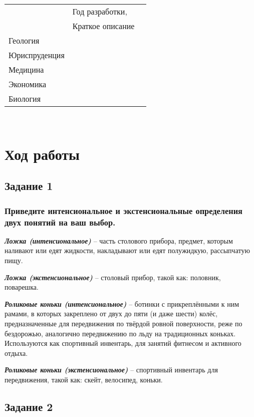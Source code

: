 \documentclass[14pt,a4paper,report]{report}
\begin{document}
\begin{enumerate}
\begin{center}
\begin{tabular}{ | l | l | l | }
       & Год разработки, &  \\
       & Краткое описание &  \\ \hline
    Геология &  &   \\ \hline
    Юриспруденция &  &   \\ \hline
    Медицина &  &   \\ \hline
    Экономика &  &   \\ \hline
    Биология &  &   \\
    \hline
    \end{tabular}\\
\end{center}
\end{enumerate}

\clearpage

\section{Ход работы}

\subsection{Задание 1}

\subsubsection{Приведите интенсиональное и экстенсиональные определения двух понятий на ваш выбор.}

\emph{\textbf{Ложка (интенсиональное)}} -- часть столового прибора, предмет, которым наливают или едят жидкости, накладывают или едят полужидкую, рассыпчатую пищу.

\emph{\textbf{Ложка (экстенсиональное)}} -- столовый прибор, такой как: половник, поварешка.

\emph{\textbf{Роликовые коньки (интенсиональное)}} -- ботинки с прикреплёнными к ним рамами, в которых закреплено от двух до пяти (и даже шести) колёс, предназначенные для передвижения по твёрдой ровной поверхности, реже по бездорожью, аналогично передвижению по льду на традиционных коньках. Используются как спортивный инвентарь, для занятий фитнесом и активного отдыха.

\emph{\textbf{Роликовые коньки (экстенсиональное)}} -- спортивный инвентарь для передвижения, такой как: скейт, велосипед, коньки.

\subsection{Задание 2}
\end{document}

